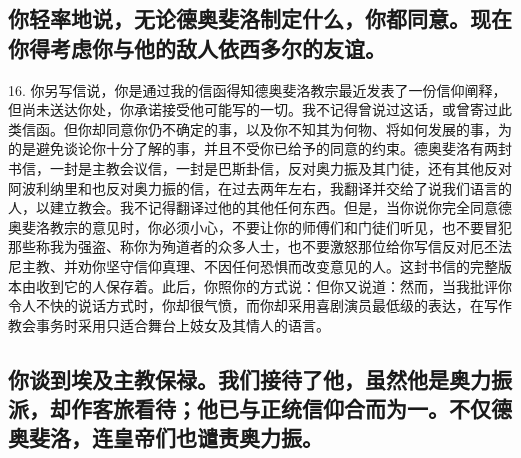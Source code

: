 
\subsection{你轻率地说，无论德奥斐洛制定什么，你都同意。现在你得考虑你与他的敌人依西多尔的友谊。}

16. 你另写信说，你是通过我的信函得知德奥斐洛教宗最近发表了一份信仰阐释，但尚未送达你处，你承诺接受他可能写的一切。我不记得曾说过这话，或曾寄过此类信函。但你却同意你仍不确定的事，以及你不知其为何物、将如何发展的事，为的是避免谈论你十分了解的事，并且不受你已给予的同意的约束。德奥斐洛有两封书信，一封是主教会议信，一封是巴斯卦信，反对奥力振及其门徒，还有其他反对阿波利纳里和也反对奥力振的信，在过去两年左右，我翻译并交给了说我们语言的人，以建立教会。我不记得翻译过他的其他任何东西。但是，当你说你完全同意德奥斐洛教宗的意见时，你必须小心，不要让你的师傅们和门徒们听见，也不要冒犯那些称我为强盗、称你为殉道者的众多人士，也不要激怒那位给你写信反对厄丕法尼主教、并劝你坚守信仰真理、不因任何恐惧而改变意见的人。这封书信的完整版本由收到它的人保存着。此后，你照你的方式说：但你又说道：然而，当我批评你令人不快的说话方式时，你却很气愤，而你却采用喜剧演员最低级的表达，在写作教会事务时采用只适合舞台上妓女及其情人的语言。\par


\subsection{你谈到埃及主教保禄。我们接待了他，虽然他是奥力振派，却作客旅看待；他已与正统信仰合而为一。不仅德奥斐洛，连皇帝们也谴责奥力振。}

